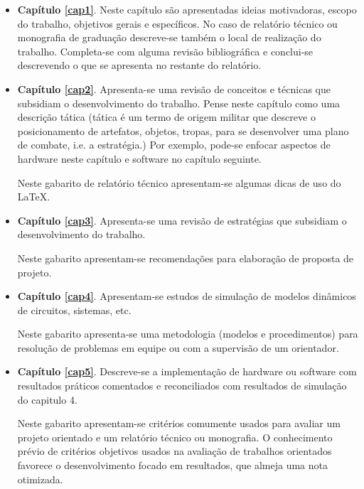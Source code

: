 \begin{itemize}

  \item \textbf{Capítulo \ref{cap1}}. Neste capítulo são apresentadas ideias motivadoras, escopo do trabalho, objetivos gerais e específicos. No caso de relatório técnico ou monografia de graduação descreve-se também o local de realização do trabalho. Completa-se com alguma revisão bibliográfica e conclui-se descrevendo o que se apresenta no restante do relatório.
  
  \item \textbf{Capítulo \ref{cap2}}. Apresenta-se uma revisão  de conceitos e técnicas que subsidiam o desenvolvimento do trabalho. 
  Pense neste capítulo como uma descrição tática (tática é um termo de origem militar que descreve o posicionamento de artefatos, objetos, tropas, para se desenvolver uma plano de combate, i.e. a estratégia.)  Por exemplo, pode-se enfocar aspectos de hardware neste capítulo e software no capítulo seguinte.
  
  Neste gabarito de relatório técnico apresentam-se algumas dicas de uso do \LaTeX.
  
  \item \textbf{Capítulo \ref{cap3}}. Apresenta-se uma revisão  de  estratégias que subsidiam o desenvolvimento do trabalho.   %
  
  Neste gabarito apresentam-se recomendações para elaboração de proposta de projeto.

  \item \textbf{Capítulo \ref{cap4}}. Apresentam-se estudos de simulação de modelos dinâmicos de circuitos, sistemas, etc.
  
    Neste gabarito apresenta-se uma metodologia (modelos e procedimentos) para resolução de problemas em equipe ou com a supervisão de um orientador.
  
  \item \textbf{Capítulo \ref{cap5}}. Descreve-se a implementação de hardware ou software com resultados práticos comentados e reconciliados com  resultados de simulação do capitulo 4.
  
      Neste gabarito apresentam-se critérios comumente usados para avaliar um projeto orientado e um relatório técnico ou monografia. O conhecimento prévio  de critérios objetivos usados na avaliação de trabalhos orientados favorece o desenvolvimento focado em resultados, que almeja uma nota otimizada.
  

\end{itemize}
